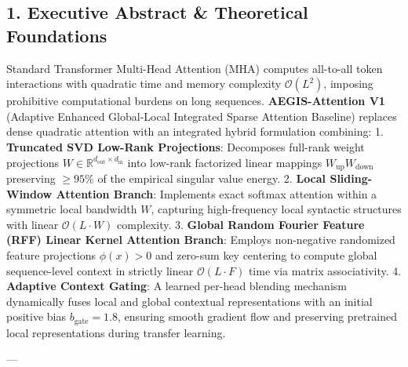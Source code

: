 \subsection{1. Executive Abstract \& Theoretical Foundations}
Standard Transformer Multi-Head Attention (MHA) computes all-to-all token interactions with quadratic time and memory complexity $\mathcal{O}(L^2)$, imposing prohibitive computational burdens on long sequences. \textbf{AEGIS-Attention V1} (Adaptive Enhanced Global-Local Integrated Sparse Attention Baseline) replaces dense quadratic attention with an integrated hybrid formulation combining:
1. \textbf{Truncated SVD Low-Rank Projections}: Decomposes full-rank weight projections $W \in \mathbb{R}^{d_{\text{out}} \times d_{\text{in}}}$ into low-rank factorized linear mappings $W_{\text{up}} W_{\text{down}}$ preserving $\ge 95\%$ of the empirical singular value energy.
2. \textbf{Local Sliding-Window Attention Branch}: Implements exact softmax attention within a symmetric local bandwidth $W$, capturing high-frequency local syntactic structures with linear $\mathcal{O}(L \cdot W)$ complexity.
3. \textbf{Global Random Fourier Feature (RFF) Linear Kernel Attention Branch}: Employs non-negative randomized feature projections $\phi(x) > 0$ and zero-sum key centering to compute global sequence-level context in strictly linear $\mathcal{O}(L \cdot F)$ time via matrix associativity.
4. \textbf{Adaptive Context Gating}: A learned per-head blending mechanism dynamically fuses local and global contextual representations with an initial positive bias $b_{\text{gate}} = 1.8$, ensuring smooth gradient flow and preserving pretrained local representations during transfer learning.

---